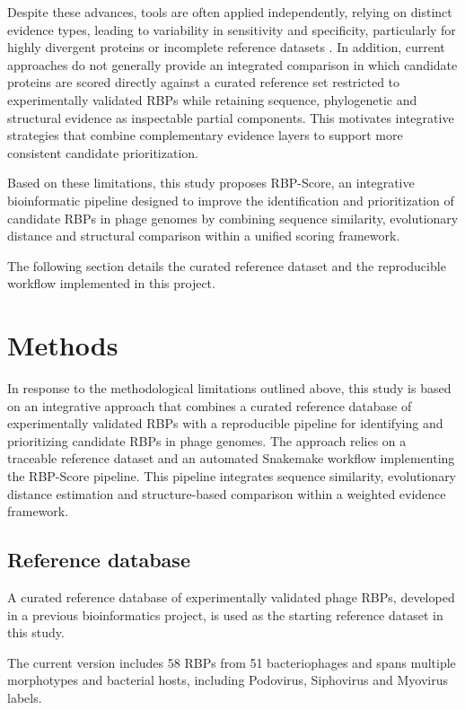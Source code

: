 \documentclass[runningheads]{llncs}
\begin{document}
Despite these advances, tools are often applied independently, relying on distinct evidence types, leading to variability in sensitivity and specificity, particularly for highly divergent proteins or incomplete reference datasets \cite{boeckaerts2022}. In addition, current approaches do not generally provide an integrated comparison in which candidate proteins are scored directly against a curated reference set restricted to experimentally validated RBPs while retaining sequence, phylogenetic and structural evidence as inspectable partial components. This motivates integrative strategies that combine complementary evidence layers to support more consistent candidate prioritization.

Based on these limitations, this study proposes RBP-Score, an integrative bioinformatic pipeline designed to improve the identification and prioritization of candidate RBPs in phage genomes by combining sequence similarity, evolutionary distance and structural comparison within a unified scoring framework.

The following section details the curated reference dataset and the reproducible workflow implemented in this project.

\section{Methods}

In response to the methodological limitations outlined above, this study is based on an integrative approach that combines a curated reference database of experimentally validated RBPs with a reproducible pipeline for identifying and prioritizing candidate RBPs in phage genomes. The approach relies on a traceable reference dataset and an automated Snakemake workflow implementing the RBP-Score pipeline. This pipeline integrates sequence similarity, evolutionary distance estimation and structure-based comparison within a weighted evidence framework.

\subsection{Reference database}

A curated reference database of experimentally validated phage RBPs, developed in a previous bioinformatics project, is used as the starting reference dataset in this study.

The current version includes 58 RBPs from 51 bacteriophages and spans multiple morphotypes and bacterial hosts, including Podovirus, Siphovirus and Myovirus labels.
\end{document}
